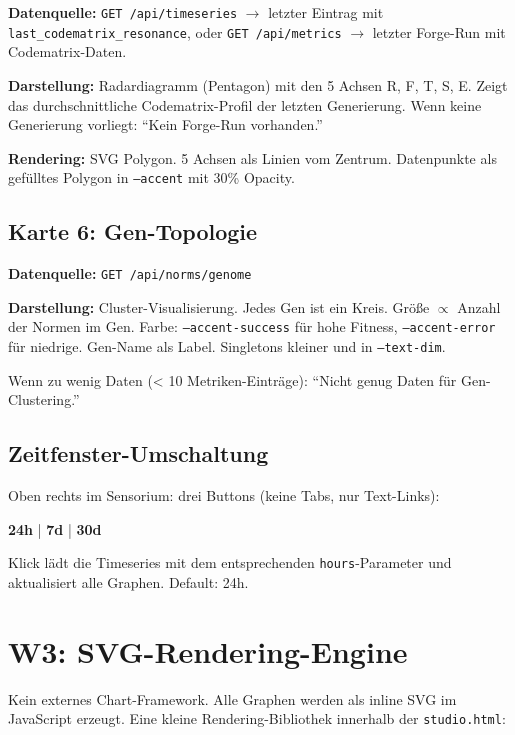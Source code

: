 \documentclass[11pt,a4paper]{article}
\begin{document}
\textbf{Datenquelle:} \texttt{GET /api/timeseries} $\to$ 
letzter Eintrag mit \texttt{last\_codematrix\_resonance}, 
oder \texttt{GET /api/metrics} $\to$ letzter Forge-Run 
mit Codematrix-Daten.

\textbf{Darstellung:} Radardiagramm (Pentagon) mit den 
5 Achsen R, F, T, S, E. Zeigt das durchschnittliche 
Codematrix-Profil der letzten Generierung. Wenn keine 
Generierung vorliegt: ``Kein Forge-Run vorhanden.''

\textbf{Rendering:} SVG Polygon. 5 Achsen als Linien vom 
Zentrum. Datenpunkte als gef\"ulltes Polygon in 
\texttt{--accent} mit 30\% Opacity.

\subsection{Karte 6: Gen-Topologie}

\textbf{Datenquelle:} \texttt{GET /api/norms/genome}

\textbf{Darstellung:} Cluster-Visualisierung. Jedes Gen 
ist ein Kreis. Gr\"o{\ss}e $\propto$ Anzahl der Normen im 
Gen. Farbe: \texttt{--accent-success} f\"ur hohe Fitness, 
\texttt{--accent-error} f\"ur niedrige. Gen-Name als Label. 
Singletons kleiner und in \texttt{--text-dim}.

Wenn zu wenig Daten (< 10 Metriken-Eintr\"age): 
``Nicht genug Daten f\"ur Gen-Clustering.''

\subsection{Zeitfenster-Umschaltung}

Oben rechts im Sensorium: drei Buttons (keine Tabs, 
nur Text-Links):

\textbf{24h} | \textbf{7d} | \textbf{30d}

Klick l\"adt die Timeseries mit dem entsprechenden 
\texttt{hours}-Parameter und aktualisiert alle Graphen.
Default: 24h.


\section{W3: SVG-Rendering-Engine}
\label{sec:w3}

Kein externes Chart-Framework. Alle Graphen werden als 
inline SVG im JavaScript erzeugt. Eine kleine 
Rendering-Bibliothek innerhalb der \texttt{studio.html}:
\end{document}
